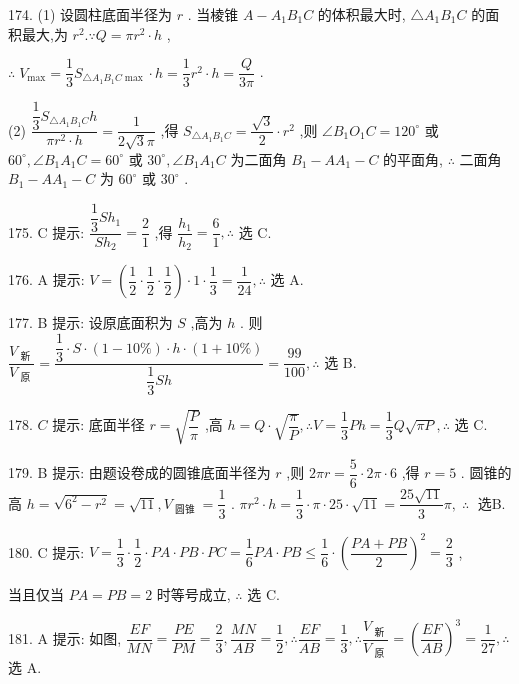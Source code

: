 174. (1) 设圆柱底面半径为 $r$ . 当棱锥 $A - {A}_{1}{B}_{1}C$ 的体积最大时, $\bigtriangleup {A}_{1}{B}_{1}C$ 的面积最大,为 ${r}^{2}.\because Q = \pi {r}^{2} \cdot  h$ ,

$\therefore \;{V}_{\max } = \dfrac{1}{3}{S}_{\bigtriangleup {A}_{1}{B}_{1}C\max } \cdot  h = \dfrac{1}{3}{r}^{2} \cdot  h = \dfrac{Q}{3\pi }$ .

(2) $\dfrac{\dfrac{1}{3}{S}_{\bigtriangleup {A}_{1}{B}_{1}C}h}{\pi {r}^{2} \cdot  h} = \dfrac{1}{2\sqrt{3}\pi }$ ,得 ${S}_{\bigtriangleup {A}_{1}{B}_{1}C} = \dfrac{\sqrt{3}}{2} \cdot  {r}^{2}$ ,则 $\angle {B}_{1}{O}_{1}C = {120}^{ \circ  }$ 或 ${60}^{ \circ  },\angle {B}_{1}{A}_{1}C = {60}^{ \circ  }$ 或 ${30}^{ \circ  },\angle {B}_{1}{A}_{1}C$ 为二面角 ${B}_{1} - A{A}_{1} - C$ 的平面角, $\therefore$ 二面角 ${B}_{1} - A{A}_{1} - C$ 为 ${60}^{ \circ  }$ 或 ${30}^{ \circ  }$ .

175. C 提示: $\dfrac{\dfrac{1}{3}S{h}_{1}}{S{h}_{2}} = \dfrac{2}{1}$ ,得 $\dfrac{{h}_{1}}{{h}_{2}} = \dfrac{6}{1},\therefore$ 选 C.

176. A 提示: $V = \left( {\dfrac{1}{2} \cdot  \dfrac{1}{2} \cdot  \dfrac{1}{2}}\right)  \cdot  1 \cdot  \dfrac{1}{3} = \dfrac{1}{24},\therefore$ 选 A.

177. B 提示: 设原底面积为 $S$ ,高为 $h$ . 则 $\dfrac{{V}_{\text{ 新 }}}{{V}_{\text{ 原 }}} = \dfrac{\dfrac{1}{3} \cdot  S \cdot  \left( {1 - {10}\% }\right)  \cdot  h \cdot  \left( {1 + {10}\% }\right) }{\dfrac{1}{3}{Sh}} = \dfrac{99}{100},\therefore$ 选 B.

178. $C$ 提示: 底面半径 $r = \sqrt{\dfrac{P}{\pi }}$ ,高 $h = Q \cdot  \sqrt{\dfrac{\pi }{P}},\therefore V = \dfrac{1}{3}{Ph} = \dfrac{1}{3}Q\sqrt{\pi P},\therefore$ 选 C.

179. B 提示: 由题设卷成的圆锥底面半径为 $r$ ,则 ${2\pi r} = \dfrac{5}{6} \cdot  {2\pi } \cdot  6$ ,得 $r = 5$ . 圆锥的高 $h = \sqrt{{6}^{2} - {r}^{2}} = \sqrt{11},{V}_{\text{ 圆锥 }} = \dfrac{1}{3}$ . $\pi {r}^{2} \cdot  h = \dfrac{1}{3} \cdot  \pi  \cdot  {25} \cdot  \sqrt{11} = \dfrac{{25}\sqrt{11}}{3}\pi ,\;\therefore \;$ 选B.

180. C 提示: $V = \dfrac{1}{3} \cdot  \dfrac{1}{2} \cdot  {PA} \cdot  {PB} \cdot  {PC} = \dfrac{1}{6}{PA} \cdot  {PB} \leq  \dfrac{1}{6} \cdot  {\left( \dfrac{{PA} + {PB}}{2}\right) }^{2} = \dfrac{2}{3}$ ,

当且仅当 ${PA} = {PB} = 2$ 时等号成立, $\therefore$ 选 C.

181. A 提示: 如图, $\dfrac{EF}{MN} = \dfrac{PE}{PM} = \dfrac{2}{3},\dfrac{MN}{AB} = \dfrac{1}{2},\therefore \dfrac{EF}{AB} = \dfrac{1}{3},\therefore \dfrac{{V}_{\text{ 新 }}}{{V}_{\text{ 原 }}} = {\left( \dfrac{EF}{AB}\right) }^{3} = \dfrac{1}{27},\therefore$ 选 A.

